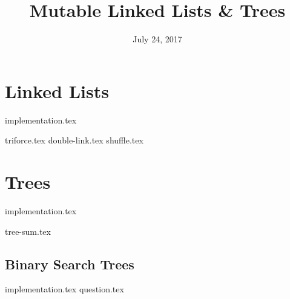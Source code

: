 \documentclass{exam}
\title{Mutable Linked Lists \& Trees}
\date{July 24, 2017}
\begin{document}
\maketitle

\section{Linked Lists}
{implementation.tex}
\begin{questions}
{triforce.tex}
{double-link.tex}
{shuffle.tex}
\end{questions}

\clearpage

\section{Trees}
{implementation.tex}
\begin{questions}
{tree-sum.tex}
\clearpage
\subsection*{Binary Search Trees}
{implementation.tex}
\marginpar{\vspace*{1in}{simple.tex}}
\marginpar{\vspace*{0.5in}{complex.tex}}
{question.tex}
\end{questions}
\end{document}

